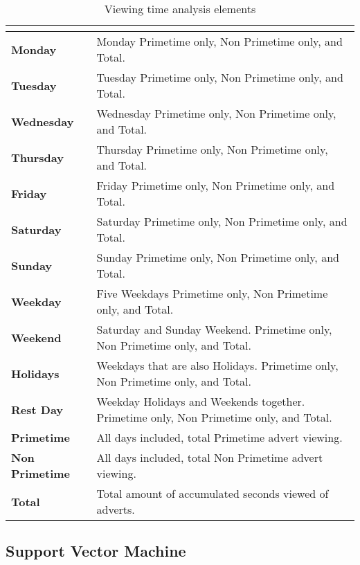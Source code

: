 \documentclass[review]{elsarticle}
\begin{document}
\begin{table} \centering
\caption{Viewing time analysis elements}\label{tab:viewtimes}
\begin{tabular}{|>{\columncolor{DarkLime}\bfseries}l|>{\columncolor{LightGreen}}m{25em}|} \arrayrulecolor{white}\hline
\rowcolor{DeepGreen}
\multicolumn{1}{|c|}{\color{white}\textbf{Viewing Time}} & \multicolumn{1}{c|}{\color{white}\textbf{Notes}} \\ \hline
Monday & Monday Primetime only, Non Primetime only, and Total. \\ \hline
Tuesday & Tuesday Primetime only, Non Primetime only, and Total. \\ \hline
Wednesday & Wednesday Primetime only, Non Primetime only, and Total. \\ \hline
Thursday & Thursday Primetime only, Non Primetime only, and Total. \\ \hline
Friday & Friday Primetime only, Non Primetime only, and Total. \\ \hline
Saturday & Saturday Primetime only, Non Primetime only, and Total. \\ \hline
Sunday & Sunday Primetime only, Non Primetime only, and Total. \\ \hline
Weekday & Five Weekdays Primetime only, Non Primetime only, and Total. \\ \hline
Weekend & Saturday and Sunday Weekend. Primetime only, Non Primetime only, and Total. \\ \hline
Holidays & Weekdays that are also Holidays. Primetime only, Non Primetime only, and Total. \\ \hline
Rest Day & Weekday Holidays and Weekends together. Primetime only, Non Primetime only, and Total. \\ \hline
Primetime & All days included, total Primetime advert viewing. \\ \hline
Non Primetime & All days included, total Non Primetime advert viewing.  \\ \hline
Total & Total amount of accumulated seconds viewed of adverts. \\ \hline
\end{tabular}
\end{table}

\subsection{Support Vector Machine}
\label{svm}
\end{document}
